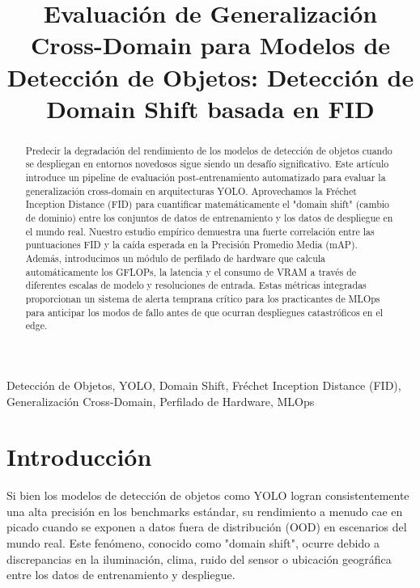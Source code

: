 \documentclass[conference]{IEEEtran}
\begin{document}
\title{Evaluación de Generalización Cross-Domain para Modelos de Detección de Objetos: Detección de Domain Shift basada en FID}

\author{
}

\maketitle

\begin{abstract}
Predecir la degradación del rendimiento de los modelos de detección de objetos cuando se despliegan en entornos novedosos sigue siendo un desafío significativo. Este artículo introduce un pipeline de evaluación post-entrenamiento automatizado para evaluar la generalización cross-domain en arquitecturas YOLO. Aprovechamos la Fréchet Inception Distance (FID) para cuantificar matemáticamente el "domain shift" (cambio de dominio) entre los conjuntos de datos de entrenamiento y los datos de despliegue en el mundo real. Nuestro estudio empírico demuestra una fuerte correlación entre las puntuaciones FID y la caída esperada en la Precisión Promedio Media (mAP). Además, introducimos un módulo de perfilado de hardware que calcula automáticamente los GFLOPs, la latencia y el consumo de VRAM a través de diferentes escalas de modelo y resoluciones de entrada. Estas métricas integradas proporcionan un sistema de alerta temprana crítico para los practicantes de MLOps para anticipar los modos de fallo antes de que ocurran despliegues catastróficos en el edge.
\end{abstract}

\begin{IEEEkeywords}
Detección de Objetos, YOLO, Domain Shift, Fréchet Inception Distance (FID), Generalización Cross-Domain, Perfilado de Hardware, MLOps
\end{IEEEkeywords}

\section{Introducción}
Si bien los modelos de detección de objetos como YOLO logran consistentemente una alta precisión en los benchmarks estándar, su rendimiento a menudo cae en picado cuando se exponen a datos fuera de distribución (OOD) en escenarios del mundo real. Este fenómeno, conocido como "domain shift", ocurre debido a discrepancias en la iluminación, clima, ruido del sensor o ubicación geográfica entre los datos de entrenamiento y despliegue.
\end{document}
